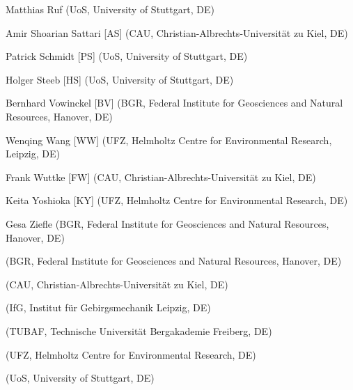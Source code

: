 \begin{list}{-}{\leftmargin=1em \itemindent=0em \itemsep=0.1em}
\item Matthias Ruf (UoS, University of Stuttgart, DE)

\item Amir Shoarian Sattari [AS] (CAU, Christian-Albrechts-Universität zu Kiel, DE)

\item Patrick Schmidt [PS] (UoS, University of Stuttgart, DE)	

\item Holger Steeb [HS] (UoS, University of Stuttgart, DE)	

\item Bernhard Vowinckel [BV] (BGR, Federal Institute for Geosciences and Natural Resources, Hanover, DE)	

\item Wenqing Wang [WW] (UFZ, Helmholtz Centre for Environmental Research, Leipzig, DE) 

\item Frank Wuttke [FW] (CAU, Christian-Albrechts-Universität zu Kiel, DE)	

\item Keita Yoshioka [KY] (UFZ, Helmholtz Centre for Environmental Research, DE) 

\item Gesa Ziefle (BGR, Federal Institute for Geosciences and Natural Resources, Hanover, DE)	

\item [] (BGR, Federal Institute for Geosciences and Natural Resources, Hanover, DE)	
\item [] (CAU, Christian-Albrechts-Universität zu Kiel, DE)	
\item [] (IfG, Institut für Gebirgsmechanik Leipzig, DE)	
\item [] (TUBAF, Technische Universit\"at Bergakademie Freiberg, DE)	
\item [] (UFZ, Helmholtz Centre for Environmental Research, DE)	
\item [] (UoS, University of Stuttgart, DE)	

\end{list}
